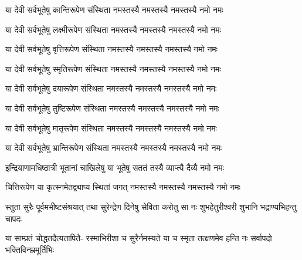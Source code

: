 \twolineshloka
{या देवी सर्वभूतेषु कान्तिरूपेण संस्थिता}
{नमस्तस्यै नमस्तस्यै नमस्तस्यै नमो नमः}%

\twolineshloka
{या देवी सर्वभूतेषु लक्ष्मीरूपेण संस्थिता}
{नमस्तस्यै नमस्तस्यै नमस्तस्यै नमो नमः}%

\twolineshloka
{या देवी सर्वभूतेषु वृत्तिरूपेण संस्थिता}
{नमस्तस्यै नमस्तस्यै नमस्तस्यै नमो नमः}%

\twolineshloka
{या देवी सर्वभूतेषु स्मृतिरूपेण संस्थिता}
{नमस्तस्यै नमस्तस्यै नमस्तस्यै नमो नमः}%

\twolineshloka
{या देवी सर्वभूतेषु दयारूपेण संस्थिता}
{नमस्तस्यै नमस्तस्यै नमस्तस्यै नमो नमः}%

\twolineshloka
{या देवी सर्वभूतेषु तुष्टिरूपेण संस्थिता}
{नमस्तस्यै नमस्तस्यै नमस्तस्यै नमो नमः}%

\twolineshloka
{या देवी सर्वभूतेषु मातृरूपेण संस्थिता}
{नमस्तस्यै नमस्तस्यै नमस्तस्यै नमो नमः}%

\twolineshloka
{या देवी सर्वभूतेषु भ्रान्तिरूपेण संस्थिता}
{नमस्तस्यै नमस्तस्यै नमस्तस्यै नमो नमः}%

\twolineshloka
{इन्द्रियाणामधिष्ठात्री भूतानां चाखिलेषु या}
{भूतेषु सततं तस्यै व्याप्त्यै दैव्यै नमो नमः}%

\twolineshloka
{चित्तिरूपेण या कृत्स्नमेतद्व्याप्य स्थितां जगत्}
{नमस्तस्यै नमस्तस्यै नमस्तस्यै नमो नमः}%

\fourlineindentedshloka
{स्तुता सुरैः पूर्वमभीष्टसंश्रयात्}
{तथा सुरेन्द्रेण दिनेषु सेविता}
{करोतु सा नः शुभहेतुरीश्वरी}
{शुभानि भद्राण्यभिहन्तु चापदः}%

\fourlineindentedshloka
{या साम्प्रतं चोद्धतदैत्यतापितै-}
{रस्माभिरीशा च सुरैर्नमस्यते}
{या च स्मृता तत्क्षणमेव हन्ति नः}
{सर्वापदो भक्तिविनम्रमूर्तिभिः}%